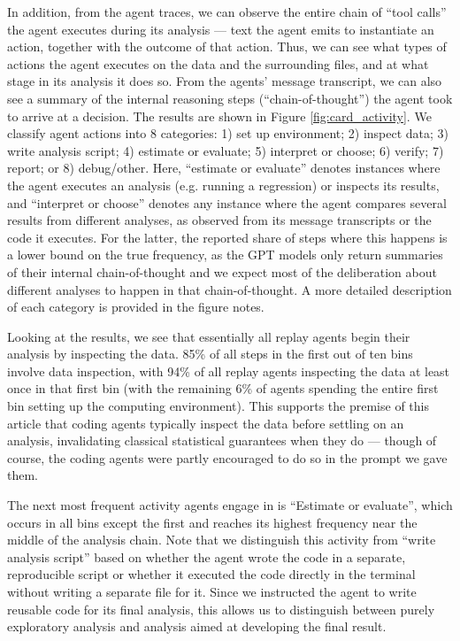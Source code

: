\documentclass[10pt]{article}
\begin{document}
 In addition, from the agent traces, we can observe the entire chain of ``tool calls'' the agent executes during its analysis --- text the agent emits to instantiate an action, together with the outcome of that action. Thus, we can see what types of actions the agent executes on the data and the surrounding files, and at what stage in its analysis it does so. From the agents' message transcript, we can also see a summary of the internal reasoning steps (``chain-of-thought'') the agent took to arrive at a decision. The results are shown in Figure \ref{fig:card_activity}. We classify agent actions into 8 categories: 1) set up environment; 2) inspect data; 3) write analysis script; 4) estimate or evaluate; 5) interpret or choose; 6) verify; 7) report; or 8) debug/other. Here, ``estimate or evaluate'' denotes instances where the agent executes an analysis (e.g. running a regression) or inspects its results, and ``interpret or choose'' denotes any instance where the agent compares several results from different analyses, as observed from its message transcripts or the code it executes. For the latter, the reported share of steps where this happens is a lower bound on the true frequency, as the GPT models only return summaries of their internal chain-of-thought and we expect most of the deliberation about different analyses to happen in that chain-of-thought. A more detailed description of each category is provided in the figure notes.

 Looking at the results, we see that essentially all replay agents begin their analysis by inspecting the data. 85\% of all steps in the first out of ten bins involve data inspection, with 94\% of all replay agents inspecting the data at least once in that first bin (with the remaining 6\% of agents spending the entire first bin setting up the computing environment). This supports the premise of this article that coding agents typically inspect the data before settling on an analysis, invalidating classical statistical guarantees when they do --- though of course, the coding agents were partly encouraged to do so in the prompt we gave them.

 The next most frequent activity agents engage in is ``Estimate or evaluate'', which occurs in all bins except the first and reaches its highest frequency near the middle of the analysis chain. Note that we distinguish this activity from ``write analysis script'' based on whether the agent wrote the code in a separate, reproducible script or whether it executed the code directly in the terminal without writing a separate file for it. Since we instructed the agent to write reusable code for its final analysis, this allows us to distinguish between purely exploratory analysis and analysis aimed at developing the final result.
\end{document}
